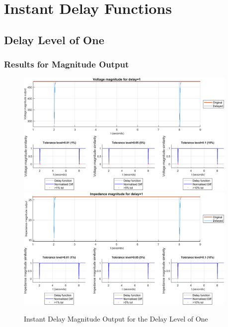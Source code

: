 \section{Instant Delay Functions}
\newpage \subsection{Delay Level of One}
\subsubsection{Results for Magnitude Output}
\begin{figure}
    \caption{Instant Delay Magnitude Output for the Delay Level of One}
    \includegraphics[width=0.95\textwidth]{PMUsim-figures/DelayOf_1/Instant_vMagnitude.png}    
      \includegraphics[width=0.95\textwidth]{PMUsim-figures/DelayOf_1/Instant_iMagnitude.png}      
    \label{fig:PMUsim_One_Magnitude}
\end{figure}
